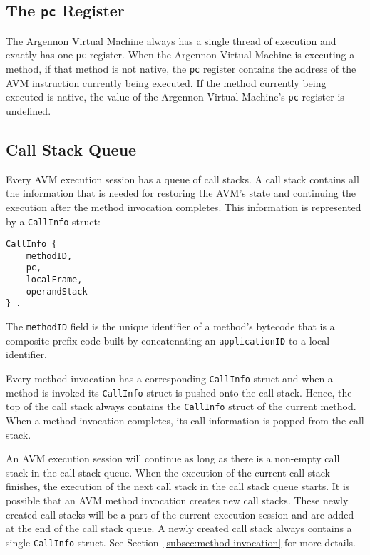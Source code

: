 \subsection{The \texttt{pc} Register}\label{subsec:the-pc-register}

The Argennon Virtual Machine always has a single thread of execution and exactly has one \texttt{pc} register.
When the Argennon Virtual Machine is executing a method, if that method is not native, the \texttt{pc} register
contains the address of the AVM instruction currently being executed. If the method currently being executed
is native, the value of the Argennon Virtual Machine's \texttt{pc} register is undefined.

\subsection{Call Stack Queue}\label{subsec:call-stack}

Every AVM execution session has a queue of call stacks. A call stack contains all the information that is needed for
restoring the AVM's state and continuing the execution after the method invocation completes.
This information is represented by a \texttt{CallInfo} struct:
\begin{verbatim}
CallInfo {
    methodID,
    pc,
    localFrame,
    operandStack
} .
\end{verbatim}

The \texttt{methodID} field is the unique identifier of a method's bytecode that
is a composite prefix code built by concatenating an \texttt{applicationID} to
a local identifier.

Every method invocation has a corresponding \texttt{CallInfo} struct and when a method is invoked its
\texttt{CallInfo} struct is pushed onto the call stack. Hence, the top of the call stack always contains
the \texttt{CallInfo} struct of the current method. When a method invocation completes, its call
information is popped from the call stack.

An AVM execution session will continue as long as there is a non-empty call stack in the call stack queue. When the
execution of the current call stack finishes, the execution of the next call stack in the call stack queue starts.
It is possible that an AVM method invocation creates new call stacks. These newly created call stacks will be a part
of the current execution session and are added at the end of the call stack queue. A newly created call stack always
contains a single \texttt{CallInfo} struct. See Section~\ref{subsec:method-invocation} for more details.

